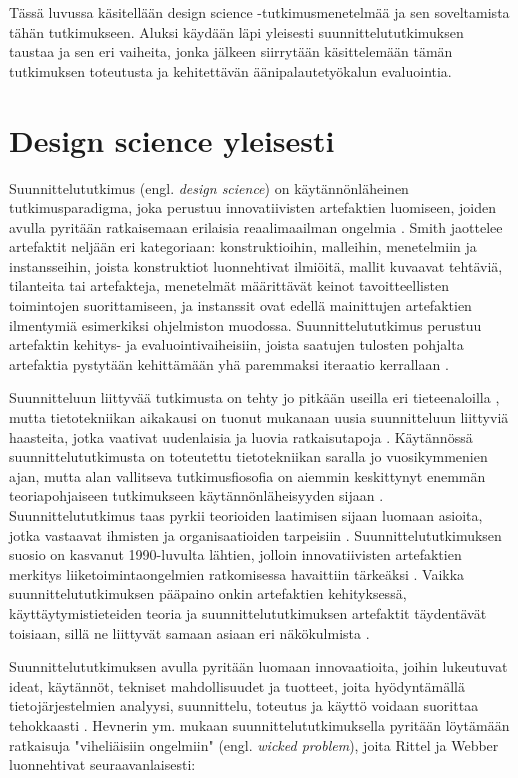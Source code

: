 \documentclass[utf8]{gradu3}
\begin{document}
Tässä luvussa käsitellään design science -tutkimusmenetelmää ja sen soveltamista tähän tutkimukseen. Aluksi käydään läpi yleisesti suunnittelututkimuksen taustaa ja sen eri vaiheita, jonka jälkeen siirrytään käsittelemään tämän tutkimuksen toteutusta ja kehitettävän äänipalautetyökalun evaluointia.

\section{Design science yleisesti}
\label{design}

Suunnittelututkimus (engl. \textit{design science}) on käytännönläheinen tutkimusparadigma, joka perustuu innovatiivisten artefaktien luomiseen, joiden avulla pyritään ratkaisemaan erilaisia reaalimaailman ongelmia \parencite{hevner2004}. Smith \parencite*{smith} jaottelee artefaktit neljään eri kategoriaan: konstruktioihin, malleihin, menetelmiin ja instansseihin, joista konstruktiot luonnehtivat ilmiöitä, mallit kuvaavat tehtäviä, tilanteita tai artefakteja, menetelmät määrittävät keinot tavoitteellisten toimintojen suorittamiseen, ja instanssit ovat edellä mainittujen artefaktien ilmentymiä esimerkiksi ohjelmiston muodossa. Suunnittelututkimus perustuu artefaktin kehitys- ja evaluointivaiheisiin, joista saatujen tulosten pohjalta artefaktia pystytään kehittämään yhä paremmaksi iteraatio kerrallaan \parencite{cycles}.

Suunnitteluun liittyvää tutkimusta on tehty jo pitkään useilla eri tieteenaloilla \parencite{cross2001}, mutta tietotekniikan aikakausi on tuonut mukanaan uusia suunnitteluun liittyviä haasteita, jotka vaativat uudenlaisia ja luovia ratkaisutapoja \parencite{design}. Käytännössä suunnittelututkimusta on toteutettu tietotekniikan saralla jo vuosikymmenien ajan, mutta alan vallitseva tutkimusfiosofia on aiemmin keskittynyt enemmän teoriapohjaiseen tutkimukseen käytännönläheisyyden sijaan \parencite{pragmatic}. Suunnittelututkimus taas pyrkii teorioiden laatimisen sijaan luomaan asioita, jotka vastaavat ihmisten ja organisaatioiden tarpeisiin \parencite{smith}. Suunnittelututkimuksen suosio on kasvanut 1990-luvulta lähtien, jolloin innovatiivisten artefaktien merkitys liiketoimintaongelmien ratkomisessa havaittiin tärkeäksi \parencite{design}. Vaikka suunnittelututkimuksen pääpaino onkin artefaktien kehityksessä, käyttäytymistieteiden teoria ja suunnittelututkimuksen artefaktit täydentävät toisiaan, sillä ne liittyvät samaan asiaan eri näkökulmista  \parencite{hevner2004}.

Suunnittelututkimuksen avulla pyritään luomaan innovaatioita, joihin lukeutuvat ideat, käytännöt, tekniset mahdollisuudet ja tuotteet, joita hyödyntämällä tietojärjestelmien analyysi, suunnittelu, toteutus ja käyttö voidaan suorittaa tehokkaasti \parencite{hevner2004}. Hevnerin ym. mukaan \parencite*{hevner2004} suunnittelututkimuksella pyritään löytämään ratkaisuja "viheliäisiin ongelmiin" (engl. \textit{wicked problem}), joita Rittel ja Webber \parencite*{wicked} luonnehtivat seuraavanlaisesti: 
\end{document}
